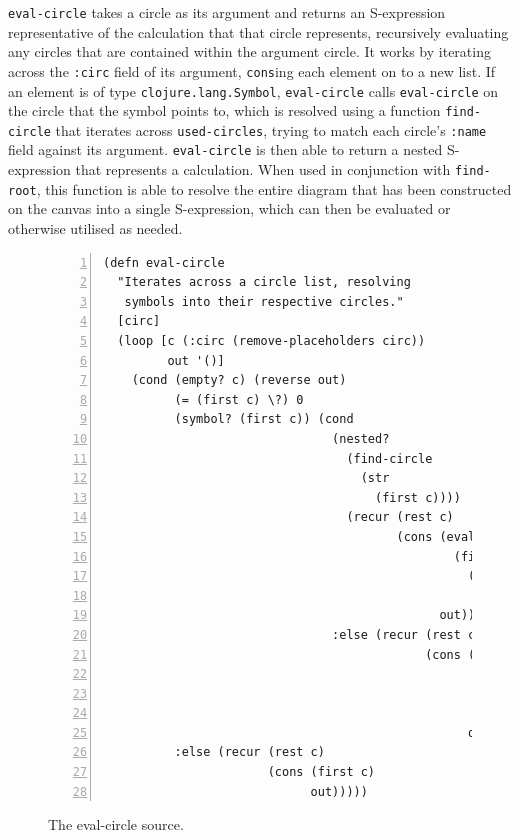 \documentclass[12pt,twoside,notitlepage,xetex]{report}
\begin{document}
\verb¬eval-circle¬ takes a circle as its argument and returns an S-expression
representative of the calculation that that circle represents, recursively
evaluating any circles that are contained within the argument circle.  It works
by iterating across the \verb¬:circ¬ field of its argument, \verb¬cons¬ing each
element on to a new list.  If an element is of type \verb¬clojure.lang.Symbol¬,
\verb¬eval-circle¬ calls \verb¬eval-circle¬ on the circle that the symbol
points to, which is resolved using a function \verb¬find-circle¬ that iterates
across \verb¬used-circles¬, trying to match each circle's \verb¬:name¬ field
against its argument.  \verb¬eval-circle¬ is then able to return a nested
S-expression that represents a calculation.  When used in conjunction with
\verb¬find-root¬, this function is able to resolve the entire diagram that has
been constructed on the canvas into a single S-expression, which can then be
evaluated or otherwise utilised as needed.

\begin{center}
\begin{figure}[H]
\begin{center}
\begin{minipage}{\textwidth-2cm}
\begin{Verbatim}[fontsize=\small,numbers=left]
(defn eval-circle
  "Iterates across a circle list, resolving
   symbols into their respective circles."
  [circ]
  (loop [c (:circ (remove-placeholders circ))
         out '()]
    (cond (empty? c) (reverse out)
          (= (first c) \?) 0
          (symbol? (first c)) (cond
                                (nested?
                                  (find-circle
                                    (str
                                      (first c))))
                                  (recur (rest c)
                                         (cons (eval-circle
                                                 (find-circle
                                                   (str
                                                     (first c))))
                                               out))
                                :else (recur (rest c)
                                             (cons (:circ
                                                     (find-circle
                                                       (str
                                                         (first c))))
                                                   out)))
          :else (recur (rest c)
                       (cons (first c)
                             out)))))
\end{Verbatim}
\end{minipage}
\end{center}
\caption{The {\ttfamily eval-circle} source.}
\end{figure}
\end{center}
\end{document}
